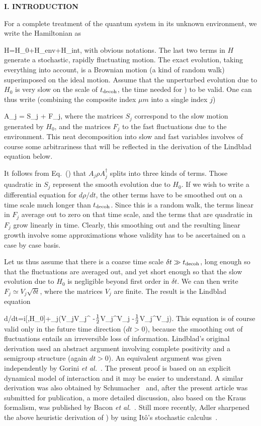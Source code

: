 \begin{center}{\bf I. INTRODUCTION}
\ec

For a complete treatment of the quantum system in its unknown
environment, we write the Hamiltonian as

\beq H=H_0+H_{{\rm env}}+H_{{\rm int}}, \eeq
with obvious notations. The last two terms in $H$ generate a stochastic,
rapidly fluctuating motion. The exact evolution, taking everything into
account, is a Brownian motion (a kind of random walk) superimposed on
the ideal motion. Assume that the unperturbed evolution due to $H_0$ is
very slow on the scale of $t_{{\rm decoh}}$, the time needed for
) to be valid. One can thus write (combining the composite
index $\mu m$ into a single index $j$)

\beq A_j = S_j + F_j, \eeq
where the matrices $S_j$ correspond to the slow motion generated by
$H_0$, and the matrices $F_j$ to the fast fluctuations due to the
environment. This neat decomposition into slow and fast variables
involves of course some arbitrariness that will be reflected in the
derivation of the Lindblad equation below.

It follows from Eq.~(\theequation) that $A_j\rho A_j^\dagger$ splits
into three kinds of terms. Those quadratic in $S_j$ represent the smooth
evolution due to $H_0$. If we wish to write a differential equation for
$d\rho/dt$, the other terms have to be smoothed out on a time scale much
longer than $t_{{\rm decoh}}$. Since this is a random walk, the terms
linear in $F_j$ average out to zero on that time scale, and the terms
that are quadratic in $F_j$ grow linearly in time. Clearly, this
smoothing out and the resulting linear growth involve some
approximations whose validity has to be ascertained on a case by case
basis.

Let us thus assume that there is a coarse time scale $\delta t\gg
t_{{\rm decoh}}$, long enough so that the fluctuations are averaged out,
and yet short enough so that the slow evolution due to $H_0$ is
negligible beyond first order in $\delta t$. We can then write
$F_j\simeq V_j\sqrt{\delta t}$, where the matrices $V_j$ are finite. The
result is the Lindblad equation~\cite{lindblad}

\beq d\rho/dt=i[\rho,H_0]+\sum_j(V_j\rho V_j^\dagger
 -\mbox{$1\over2$}\rho V_j^\dagger V_j
 -\mbox{$1\over2$}V_j^\dagger V_j\rho). \label{QDS} \eeq
This equation is of course valid only in the future time direction
($dt>0$), because the smoothing out of fluctuations entails an
irreversible loss of information. Lindblad's original derivation used an
abstract argument involving complete positivity and a semigroup
structure (again $dt>0$). An equivalent argument was given independently
by Gorini {\it et al.\/}~\cite{gorini}. The present proof is based on an
explicit dynamical model of interaction and it may be easier to
understand. A similar derivation was also obtained by
Schumacher~\cite{schu} and, after the present article was submitted for
publication, a more detailed discussion, also based on the Kraus
formalism, was published by Bacon {\it et al.\/}~\cite{bacon}. Still
more recently, Adler sharpened the above heuristic derivation of
) by using It\^o's stochastic calculus~\cite{adler}.\bigskip


\end{center}
